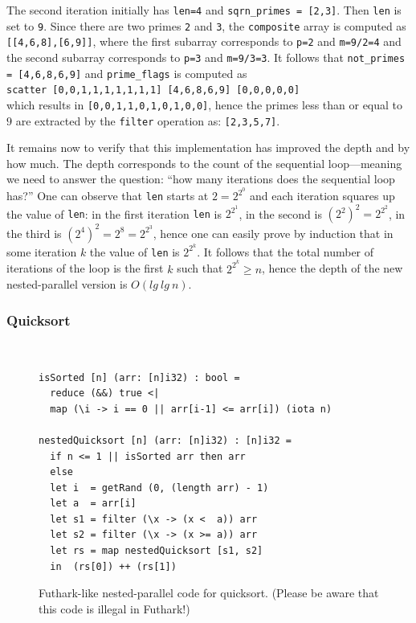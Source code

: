 \documentclass[acmsmall,review]{acmart}\settopmatter{printfolios=true,printccs=false,printacmref=false}
\begin{document}
The second iteration initially has {\tt len=4} and 
{\tt sqrn\_primes = [2,3]}. Then {\tt len} is set to {\tt 9}.
Since there are two primes {\tt 2} and {\tt 3}, the
{\tt composite} array is computed as {\tt [[4,6,8],[6,9]]},
where the first subarray corresponds to {\tt p=2} and {\tt m=9/2=4}
and the second subarray corresponds to {\tt p=3} and {\tt m=9/3=3}.
It follows that {\tt not\_primes = [4,6,8,6,9]} and
{\tt prime\_flags} is computed as\\
\lstinline{scatter [0,0,1,1,1,1,1,1,1] [4,6,8,6,9] [0,0,0,0,0]}\\
which results in {\tt [0,0,1,1,0,1,0,1,0,0]}, hence the
primes less than or equal to $9$ are extracted by the
\lstinline{filter} operation as: {\tt[2,3,5,7]}.

\medskip

It remains now to verify that this implementation has improved the
depth and by how much.
The depth corresponds to the count of the sequential 
loop---meaning we need to answer the question: ``how many iterations
does the sequential loop has?''   One can observe that {\tt len} 
starts at $2=2^{2^0}$ and each iteration squares up the value of {\tt len}:
in the first iteration {\tt len} is $2^{2^1}$, in the second is $(2^2)^2=2^{2^2}$,
in the third is $(2^4)^2=2^8=2^{2^3}$, hence one can easily
prove by induction that in some iteration $k$ the value of {\tt len} 
is $2^{2^k}$.
It follows that the total number of iterations of the loop
is the first $k$ such that $2^{2^k} \geq n$, hence the depth of 
the new nested-parallel version is $O(lg~lg~n)$.


\subsubsection{Quicksort}
\label{subsubsub:quicksort}
$\mbox{ }$\\

\begin{figure}
\begin{lstlisting}[mathescape=true]
isSorted [n] (arr: [n]i32) : bool =
  reduce (&&) true <|
  map (\i -> i == 0 || arr[i-1] <= arr[i]) (iota n)

nestedQuicksort [n] (arr: [n]i32) : [n]i32 = 
  if n <= 1 || isSorted arr then arr
  else
  let i  = getRand (0, (length arr) - 1)
  let a  = arr[i]
  let s1 = filter (\x -> (x <  a)) arr
  let s2 = filter (\x -> (x >= a)) arr
  let rs = map nestedQuicksort [s1, s2]
  in  (rs[0]) ++ (rs[1])
\end{lstlisting}\vspace{-4ex}
\caption{Futhark-like nested-parallel code for quicksort. (Please be aware that this code is illegal in Futhark!)}
\label{fig:quicksort-nested-par-Futhark}
\end{figure}
\end{document}
